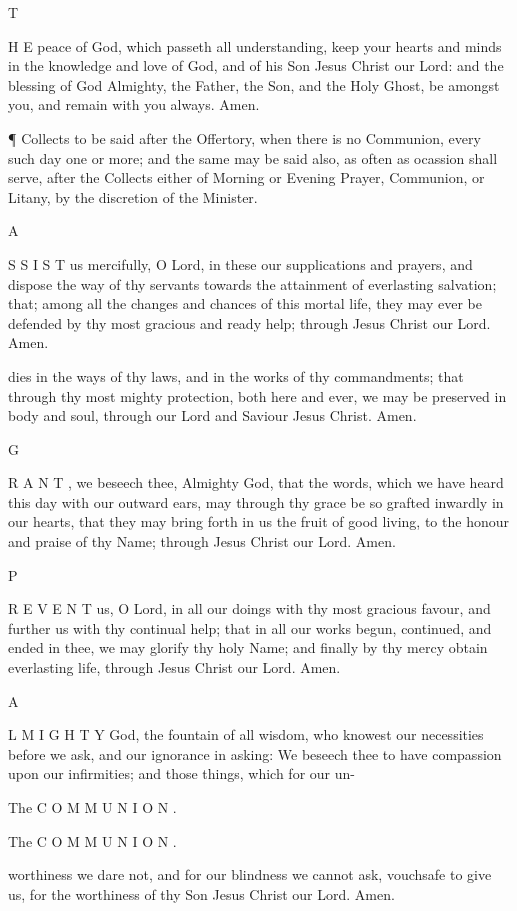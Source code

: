 T

H E peace of God, which passeth all understanding, keep your hearts and minds in the knowledge and love of God, and of his Son Jesus Christ our Lord: and the blessing of God Almighty, the Father, the Son, and the Holy Ghost, be amongst you, and remain with you always. Amen.

¶ Collects to be said after the Offertory, when there is no Communion, every such day one or more; and the same may be said also, as often as ocassion shall serve, after the Collects either of Morning or Evening Prayer, Communion, or Litany, by the discretion of the Minister.

A

S S I S T us mercifully, O Lord, in these our supplications and prayers, and dispose the way of thy servants towards the attainment of everlasting salvation; that; among all the changes and chances of this mortal life, they may ever be defended by thy most gracious and ready help; through Jesus Christ our Lord. Amen.

dies in the ways of thy laws, and in the works of thy commandments; that through thy most mighty protection, both here and ever, we may be preserved in body and soul, through our Lord and Saviour Jesus Christ. Amen.

G

R A N T , we beseech thee, Almighty God, that the words, which we have heard this day with our outward ears, may through thy grace be so grafted inwardly in our hearts, that they may bring forth in us the fruit of good living, to the honour and praise of thy Name; through Jesus Christ our Lord. Amen.

P

R E V E N T us, O Lord, in all our doings with thy most gracious favour, and further us with thy continual help; that in all our works begun, continued, and ended in thee, we may glorify thy holy Name; and finally by thy mercy obtain everlasting life, through Jesus Christ our Lord. Amen.

A

L M I G H T Y God, the fountain of all wisdom, who knowest our necessities before we ask, and our ignorance in asking: We beseech thee to have compassion upon our infirmities; and those things, which for our un-

The C O M M U N I O N .

The C O M M U N I O N .

worthiness we dare not, and for our blindness we cannot ask, vouchsafe to give us, for the worthiness of thy Son Jesus Christ our Lord. Amen.

